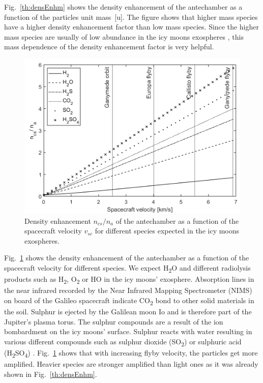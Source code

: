 	Fig.~\ref{th:densEnhm} shows the density enhancement of the antechamber as a function of the particles unit mass~[u]. The figure shows that higher mass species have a higher density enhancement factor than low mass species. Since the higher mass species are usually of low abundance in the icy moons exospheres \cite{Vorburger2015,Vorburger_2018}, this mass dependence of the density enhancement factor is very helpful.

	\begin{figure}[H] %
		\centering
		\includegraphics[width= .7\textwidth]{Bilder/velocityV1.png}
		\caption{Density enhancement $n_{cs}/n_a$ of the antechamber as a function of the spacecraft velocity $v_{sc}$ for different species expected in the icy moons exospheres.}
		\label{th:densEnhvelo}
	\end{figure}
	Fig.~\ref{th:densEnhvelo} shows the density enhancement of the antechamber as a function of the spacecraft velocity for different species. We expect H\textsubscript{2}O and different radiolysis products such as H\textsubscript{2}, O\textsubscript{2} or HO in the icy moons' exosphere. Absorption lines in the near infrared recorded by the Near Infrared Mapping Spectrometer (NIMS) on board of the Galileo spacecraft indicate CO\textsubscript{2} bond to other solid materials in the soil. Sulphur is ejected by the Galilean moon Io and is therefore part of the Jupiter's plasma torus. The sulphur compounds are a result of the ion bombardment on the icy moons' surface. Sulphur reacts with water resulting in various different compounds such as sulphur dioxide (SO\textsubscript{2}) or sulphuric acid (H\textsubscript{2}SO\textsubscript{4}) \cite{Collins_2014}. Fig.~\ref{th:densEnhvelo} shows that with increasing flyby velocity, the particles get more amplified. Heavier species are stronger amplified than light ones as it was already shown in Fig.~\ref{th:densEnhm}.\\

